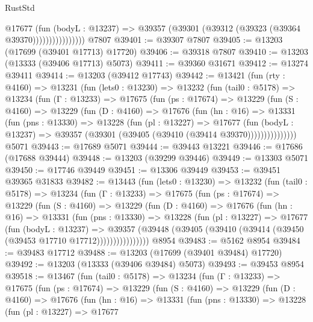 \begin{lexlean}{RustStd}
\begin{coremodule}
                        @17677
                          (fun (bodyL : @13237) =>
                          @39357 (@39301 (@39312 (@39323 (@39364 @39370))))))))))))))))
    @7807
@39401 := @39307 @7807
@39405 := @13203 (@17699 (@39401 @17713) @17720)
@39406 := @39318 @7807
@39410 := @13203 (@13333 (@39406 @17713) @5073)
@39411 := @39360 @31671
@39412 := @13274 @39411
@39414 := @13203 (@39412 @17743)
@39442 := @13421
    (fun (rty : @4160) =>
    @13231
      (fun (lets0 : @13230) =>
      @13232
        (fun (tail0 : @5178) =>
        @13234
          (fun (Γ : @13233) =>
          @17675
            (fun (ps : @17674) =>
            @13229
              (fun (S : @4160) =>
              @13229
                (fun (D : @4160) =>
                @17676
                  (fun (hn : @16) =>
                  @13331
                    (fun (pns : @13330) =>
                    @13228
                      (fun (pl : @13227) =>
                      @17677
                        (fun (bodyL : @13237) =>
                        @39357 (@39301 (@39405 (@39410 (@39414 @39370)))))))))))))))
    @5071
@39443 := @17689 @5071
@39444 := @39443 @13221
@39446 := @17686 (@17688 @39444)
@39448 := @13203 (@39299 @39446)
@39449 := @13303 @5071
@39450 := @17746 @39449
@39451 := @13306 @39449
@39453 := @39451 @39365 @31833
@39482 := @13443
    (fun (lets0 : @13230) =>
    @13232
      (fun (tail0 : @5178) =>
      @13234
        (fun (Γ : @13233) =>
        @17675
          (fun (ps : @17674) =>
          @13229
            (fun (S : @4160) =>
            @13229
              (fun (D : @4160) =>
              @17676
                (fun (hn : @16) =>
                @13331
                  (fun (pns : @13330) =>
                  @13228
                    (fun (pl : @13227) =>
                    @17677
                      (fun (bodyL : @13237) =>
                      @39357
                        (@39448
                          (@39405 (@39410 (@39414 (@39450 (@39453 @17710 @17712))))))))))))))))
    @8954
@39483 := @5162 @8954
@39484 := @39483 @17712
@39488 := @13203 (@17699 (@39401 @39484) @17720)
@39492 := @13203 (@13333 (@39406 @39484) @5073)
@39493 := @39453 @8954
@39518 := @13467
    (fun (tail0 : @5178) =>
    @13234
      (fun (Γ : @13233) =>
      @17675
        (fun (ps : @17674) =>
        @13229
          (fun (S : @4160) =>
          @13229
            (fun (D : @4160) =>
            @17676
              (fun (hn : @16) =>
              @13331
                (fun (pns : @13330) =>
                @13228
                  (fun (pl : @13227) =>
                  @17677

\end{coremodule}
\end{lexlean}
